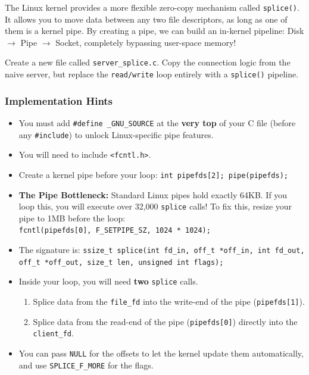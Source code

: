 \documentclass[11pt, a4paper]{article}
\begin{document}
The Linux kernel provides a more flexible zero-copy mechanism called \texttt{splice()}. It allows you to move data between any two file descriptors, as long as one of them is a kernel pipe. By creating a pipe, we can build an in-kernel pipeline: Disk $\rightarrow$ Pipe $\rightarrow$ Socket, completely bypassing user-space memory!

Create a new file called \texttt{server\_splice.c}. Copy the connection logic from the naive server, but replace the \texttt{read/write} loop entirely with a \texttt{splice()} pipeline.

\subsubsection*{Implementation Hints}
\begin{itemize}
    \item You must add \texttt{\#define \_GNU\_SOURCE} at the \textbf{very top} of your C file (before any \texttt{\#include}) to unlock Linux-specific pipe features.
    \item You will need to include \texttt{<fcntl.h>}.
    \item Create a kernel pipe before your loop: \texttt{int pipefds[2]; pipe(pipefds);}
    \item \textbf{The Pipe Bottleneck:} Standard Linux pipes hold exactly 64KB. If you loop this, you will execute over 32,000 \texttt{splice} calls! To fix this, resize your pipe to 1MB before the loop: \\
    \texttt{fcntl(pipefds[0], F\_SETPIPE\_SZ, 1024 * 1024);}
    \item The signature is: \texttt{ssize\_t splice(int fd\_in, off\_t *off\_in, int fd\_out, off\_t *off\_out, size\_t len, unsigned int flags);}
    \item Inside your loop, you will need \textbf{two} \texttt{splice} calls. 
    \begin{enumerate}
        \item Splice data from the \texttt{file\_fd} into the write-end of the pipe (\texttt{pipefds[1]}).
        \item Splice data from the read-end of the pipe (\texttt{pipefds[0]}) directly into the \texttt{client\_fd}.
    \end{enumerate}
    \item You can pass \texttt{NULL} for the offsets to let the kernel update them automatically, and use \texttt{SPLICE\_F\_MORE} for the flags.
\end{itemize}
\end{document}
